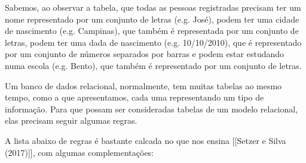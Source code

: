 Sabemos, ao observar a tabela, que todas as pessoas registradas precisam ter um nome representado por um conjunto de letras (e.g. José), podem ter uma cidade de nascimento (e.g. Campinas), que também é representada por um conjunto de letras, podem ter uma dada de nascimento (e.g. 10/10/2010), que é representado por um conjunto de números separados por barras e podem estar estudando numa escola (e.g. Bento), que também é representado por um conjunto de letras.

Um banco de dados relacional, normalmente, tem muitas tabelas ao mesmo tempo, como a que apresentamos, cada uma representando um tipo de informação. Para que possam ser consideradas tabelas de um modelo relacional, elas precisam seguir algumas regras.

A lista abaixo de regras é bastante calcada no que nos ensina  [[Setzer e Silva (2017)]], com algumas complementações:


